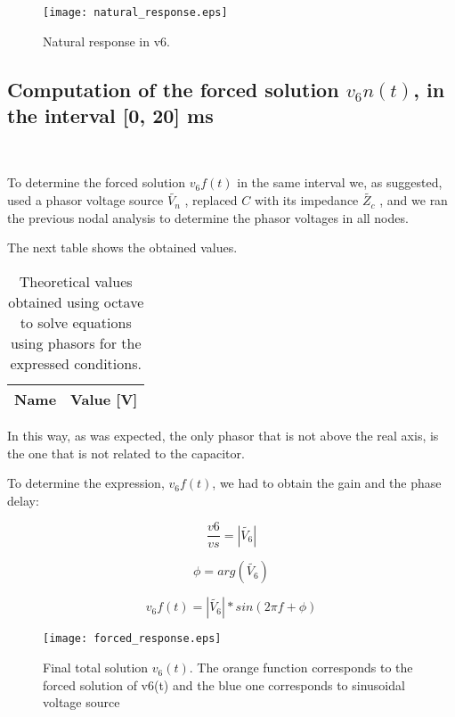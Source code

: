 \begin{figure}[h] \centering
\texttt{[image: natural\_response.eps]}
\caption{Natural response in v6.}
\label{fig:nat}
\end{figure}





\subsection{Computation of the forced solution $v_6n(t)$, in the interval [0, 20] ms}\


To determine the forced solution $v_6f(t)$ in the same interval we, as suggested, used a phasor voltage source $\tilde{V_n}$ , replaced $C$ with its impedance $\tilde{Z_c}$ , and  we ran the previous nodal analysis to determine the phasor voltages in all nodes. 

The next table shows the obtained values.

\begin{table}[h]
  \centering
  \begin{tabular}{|l|r|}
    \hline    
    {\bf Name} & {\bf Value [V]} \\ \hline
    
  \end{tabular}
  \caption{Theoretical values obtained using octave to solve equations using phasors for the expressed conditions.}
  \label{tab:PH}
\end{table}

\newpage
In this way, as was expected, the only phasor that is not above the real axis, is the one that is not related to the capacitor. 

To determine the expression, $v_6f(t)$, we had to obtain the gain and the phase delay:


\begin{equation}
  \frac{v6}{vs}=|\tilde{V_6}|
  \label{eq:vo_nat}
\end{equation}

\begin{equation}
  {{\displaystyle \phi }}=arg(\tilde{V_6})
  \label{eq:vo_nat}
\end{equation}

\begin{equation}
  {v_6f(t)}=|\tilde{V_6}|*sin(2\pi f+ {\displaystyle \phi })
  \label{eq:vo_nat}
\end{equation}


\begin{figure}[h] \centering
\texttt{[image: forced\_response.eps]}
\caption{Final total solution $v_6(t)$. The orange function corresponds to the forced solution of v6(t) and the blue one corresponds to sinusoidal voltage source }
\label{fig:forced}
\end{figure}
\newpage

